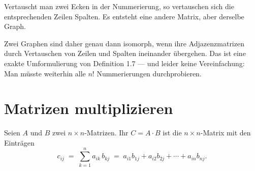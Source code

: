 \begin{warnung}
Vertauscht man zwei Ecken in der Nummerierung, so vertauschen sich die entsprechenden Zeilen  Spalten. Es entsteht eine andere Matrix, aber derselbe Graph.

Zwei Graphen sind daher genau dann isomorph, wenn ihre Adjazenzmatrizen durch  Vertauschen von Zeilen und Spalten ineinander übergehen. Das ist eine exakte Umformulierung von Definition 1.7 --- und leider keine Vereinfachung: Man müsste weiterhin alle $n!$ Nummerierungen durchprobieren.

\begin{center}
\begin{minipage}{0.88\textwidth}
\end{minipage}
\end{center}
\end{warnung}

\section{Matrizen multiplizieren}

\begin{definition}
Seien $A$ und $B$ zwei $n \times n$-Matrizen. Ihr  $C = A \cdot B$ ist die $n \times n$-Matrix mit den Einträgen
\[ c_{ij} \;=\; \sum_{k=1}^{n} a_{ik} \, b_{kj} \;=\; a_{i1}b_{1j} + a_{i2}b_{2j} + \cdots + a_{in}b_{nj} . \]
\end{definition}

